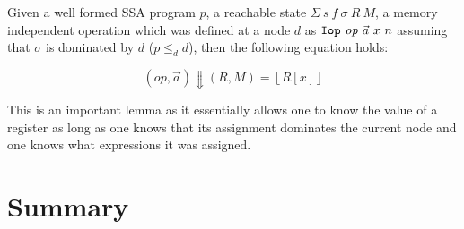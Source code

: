 Given a well formed SSA program $p$, a reachable state
$\Sigma\ s\ f\ \sigma\ R\ M$, a memory independent operation which was defined
at a node $d$ as $\mono{Iop}\ \mathit{op}\ \vec{a}\ x\ n$ assuming that $\sigma$
is dominated by $d$ ($p \le_{d} d$), then the following equation holds:

\begin{equation}\label{eq:equational-lemma}
  \left(\mathit{op}, \vec{a}\right) \Downarrow (R, M) = \left\lfloor R[x] \right\rfloor
\end{equation}

This is an important lemma as it essentially allows one to know the value of a
register as long as one knows that its assignment dominates the current node and
one knows what expressions it was assigned.

\section{Summary}%
\label{sec:bg:summary}

